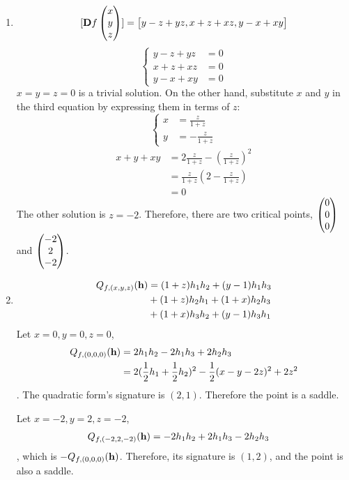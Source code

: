 \documentclass{homework}
\begin{document}
\begin{problem}{3}
\begin{enumerate}
\item
$$[\mathbf{D}f\begin{pmatrix}x\\y\\z\end{pmatrix}] = \begin{bmatrix}y-z+yz, x+z+xz, y-x+xy\end{bmatrix}$$
$$\left\{
\begin{aligned}
y-z+yz &= 0\\
x+z+xz &= 0\\
y-x+xy &= 0
\end{aligned}
\right.$$
$x=y=z=0$ is a trivial solution. On the other hand, substitute $x$
and $y$ in the third equation by expressing them in terms of $z$:
$$\left\{
\begin{aligned}
x &= \frac{z}{1+z}\\
y &= -\frac{z}{1+z}
\end{aligned}
\right.$$
\begin{align*}
x+y+xy
&= 2\frac{z}{1+z}-(\frac{z}{1+z})^2 \\
&= \frac{z}{1+z}(2-\frac{z}{1+z})   \\
&= 0
\end{align*}
The other solution is $z = -2$. Therefore, there are two critical points,
$\begin{pmatrix}0\\0\\0\end{pmatrix}$ and $\begin{pmatrix}-2\\2\\-2\end{pmatrix}$.

\item
\begin{align*}
Q_{f, (x,y,z)}(\mathbf{h})
&= (1+z)h_1h_2 + (y-1)h_1h_3 \\
&+ (1+z)h_2h_1 + (1+x)h_2h_3 \\
&+ (1+x)h_3h_2 + (y-1)h_3h_1
\end{align*}
Let $x=0, y=0, z=0$,
\begin{align*}
Q_{f, (0,0,0)}(\mathbf{h})
&= 2h_1h_2 - 2h_1h_3 + 2h_2h_3 \\
&= 2(\frac{1}{2}h_1 + \frac{1}{2}h_2)^2
- \frac{1}{2}(x-y-2z)^2 + 2z^2
\end{align*}
. The quadratic form's signature is $(2, 1)$. Therefore the point is a saddle.

Let $x=-2,y=2,z=-2$,
\begin{align*}
Q_{f, (-2,2,-2)}(\mathbf{h})
&= -2h_1h_2 + 2h_1h_3 - 2h_2h_3
\end{align*}
, which is $-Q_{f, (0,0,0)}(\mathbf{h})$. Therefore, its signature is $(1,2)$,
and the point is also a saddle.

\end{enumerate}
\end{problem}
\end{document}
